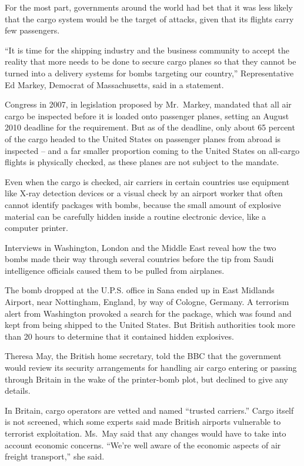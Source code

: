 ﻿\documentclass[12pt]{article}
\begin{document}
For the most part, governments around the world had bet that it was less likely that the cargo
system would be the target of attacks, given that its flights carry few passengers.

``It is time for the shipping industry and the business community to accept the reality that more
needs to be done to secure cargo planes so that they cannot be turned into a delivery systems for
bombs targeting our country,'' Representative Ed Markey, Democrat of Massachusetts, said in a
statement.

Congress in 2007, in legislation proposed by Mr.~Markey, mandated that all air cargo be inspected
before it is loaded onto passenger planes, setting an August 2010 deadline for the requirement. But
as of the deadline, only about 65 percent of the cargo headed to the United States on passenger
planes from abroad is inspected -- and a far smaller proportion coming to the United States on
all-cargo flights is physically checked, as these planes are not subject to the mandate.

Even when the cargo is checked, air carriers in certain countries use equipment like X-ray detection
devices or a visual check by an airport worker that often cannot identify packages with bombs,
because the small amount of explosive material can be carefully hidden inside a routine electronic
device, like a computer printer.

Interviews in Washington, London and the Middle East reveal how the two bombs made their way through
several countries before the tip from Saudi intelligence officials caused them to be pulled from
airplanes.

The bomb dropped at the U.P.S. office in Sana ended up in East Midlands Airport, near Nottingham,
England, by way of Cologne, Germany. A terrorism alert from Washington provoked a search for the
package, which was found and kept from being shipped to the United States. But British authorities
took more than 20 hours to determine that it contained hidden explosives.

Theresa May, the British home secretary, told the BBC that the government would review its security
arrangements for handling air cargo entering or passing through Britain in the wake of the
printer-bomb plot, but declined to give any details.

In Britain, cargo operators are vetted and named ``trusted carriers.'' Cargo itself is not screened,
which some experts said made British airports vulnerable to terrorist exploitation. Ms.~May said
that any changes would have to take into account economic concerns. ``We're well aware of the
economic aspects of air freight transport,'' she said.
\end{document}
